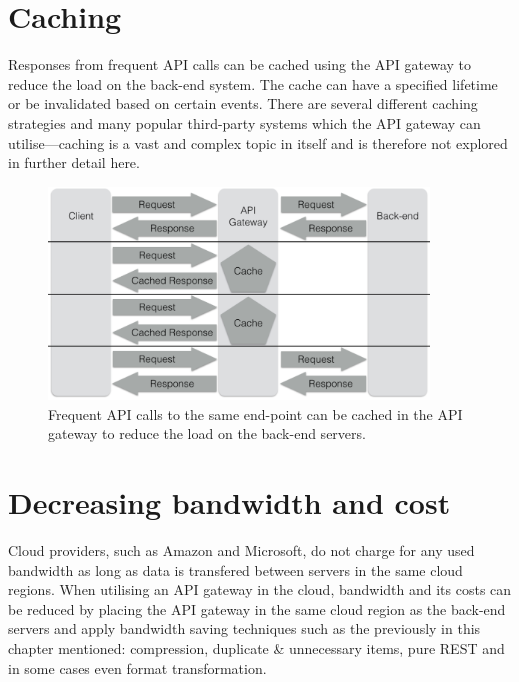 \documentclass{cslthse-msc}
\begin{document}
\section{Caching}
\label{caching}
Responses from frequent API calls can be cached using the API gateway to reduce the load on the back-end system\cite[page 107]{AASG}. The cache can have a specified lifetime or be invalidated based on certain events. There are several different caching strategies and many popular third-party systems which the API gateway can utilise---caching is a vast and complex topic in itself and is therefore not explored in further detail here.

\begin{figure}[H]
  \centering
    \begin{center}
      \includegraphics[width=0.9\textwidth]{images/api_gateway_cache.png}
    \end{center}
  \caption{Frequent API calls to the same end-point can be cached in the API gateway to reduce the load on the back-end servers.}
\end{figure}

\section{Decreasing bandwidth and cost}
Cloud providers, such as Amazon\cite{cloud_amazon} and Microsoft\cite{cloud_microsoft}, do not charge for any used bandwidth as long as data is transfered between servers in the same cloud regions. When utilising an API gateway in the cloud, bandwidth and its costs can be reduced by placing the API gateway in the same cloud region as the back-end servers and apply bandwidth saving techniques such as the previously in this chapter mentioned: compression, duplicate \& unnecessary items, pure REST and in some cases even format transformation.
\end{document}
